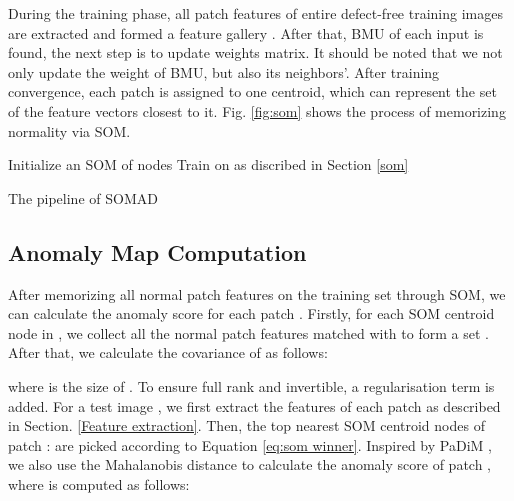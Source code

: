 \documentclass{article}
\begin{document}
During the training phase, all patch features of entire defect-free training images are extracted and formed a feature gallery . 
After that, BMU of each input is found, the next step is to update weights matrix. It should be noted that we not only update the weight of BMU, but also its neighbors'.
After training convergence, each patch is assigned to one centroid, which can represent the set of the feature vectors closest to it. Fig. \ref{fig:som} shows the process of memorizing normality via SOM.

\begin{algorithm}[!t]
    \SetAlgoNoLine
    \BlankLine
    Initialize an SOM of  nodes   \;
    Train  on  as discribed in Section \ref{som}  \;
    \caption{The pipeline of SOMAD}
    \label{alg:pipline}
\end{algorithm}

\subsection{Anomaly Map Computation}
\label{anomaly_map}
After memorizing all normal patch features on the training set through SOM, we can calculate the anomaly score for each patch . 
Firstly, for each SOM centroid node  in , we collect all the normal patch features matched with  to form a set . After that, we calculate the covariance  of  as follows:

where  is the size of . To ensure  full rank and invertible, a regularisation term  is added. 
For a test image , we first extract the features  of each patch as described in Section. \ref{Feature extraction}. 
Then, the top  nearest SOM centroid nodes of patch :  are picked according to Equation \eqref{eq:som winner}. Inspired by PaDiM \cite{Padim}, we also use the Mahalanobis distance \cite{Mahalanobis}  to calculate the anomaly score of patch , where  is computed as follows:
\end{document}
